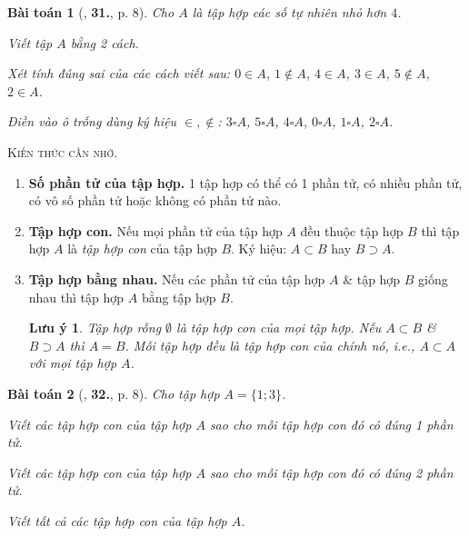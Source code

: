 \documentclass{article}
\numberwithin{equation}{section}
\newtheorem{baitoan}{Bài toán}[section]
\newtheorem{luuy}{Lưu ý}[section]
\begin{document}
\begin{baitoan}[\cite{Trong_Toan_6_2021}, \textbf{31.}, p. 8]
	 Cho $A$ là tập hợp các số tự nhiên nhỏ hơn $4$.
	 \begin{enumerate*}
	 	\item Viết tập $A$ bằng 2 cách.
	 	\item Xét tính đúng sai của các cách viết sau: $0\in A$, $1\notin A$, $4\in A$, $3\in A$, $5\notin A$, $2\in A$.
	 	\item Điền vào ô trống dùng ký hiệu $\in,\notin$: $3\square A$, $5\square A$, $4\square A$, $0\square A$, $1\square A$, $2\square A$.
	 \end{enumerate*}
\end{baitoan}
\noindent\textsc{Kiến thức cần nhớ.}
\begin{tcolorbox}
	\begin{enumerate}
		\item \textbf{Số phần tử của tập hợp.} 1 tập hợp có thể có 1 phần tử, có nhiều phần tử, có vô số phần tử hoặc không có phần tử nào.
		\item \textbf{Tập hợp con.} Nếu mọi phần tử của tập hợp $A$ đều thuộc tập hợp $B$ thì tập hợp $A$ là \textit{tập hợp con} của tập hợp $B$. Ký hiệu: $A\subset B$ hay $B\supset A$.
		\item \textbf{Tập hợp bằng nhau.} Nếu các phần tử của tập hợp $A$ \& tập hợp $B$ giống nhau thì tập hợp $A$ bằng tập hợp $B$.
		
		\begin{luuy}
			Tập hợp rỗng $\emptyset$ là tập hợp con của mọi tập hợp. Nếu $A\subset B$ \& $B\supset A$ thì $A = B$. Mỗi tập hợp đều là tập hợp con của chính nó, i.e., $A\subset A$ với mọi tập hợp $A$.
		\end{luuy}
	\end{enumerate}
\end{tcolorbox}

\begin{baitoan}[\cite{Trong_Toan_6_2021}, \textbf{32.}, p. 8]
	Cho tập hợp $A = \{1;3\}$.
	\begin{enumerate*}
		\item Viết các tập hợp con của tập hợp $A$ sao cho mỗi tập hợp con đó có đúng 1 phần tử.
		\item Viết các tập hợp con của tập hợp $A$ sao cho mỗi tập hợp con đó có đúng 2 phần tử.
		\item Viết tất cả các tập hợp con của tập hợp $A$.
	\end{enumerate*}
\end{baitoan}
\end{document}
